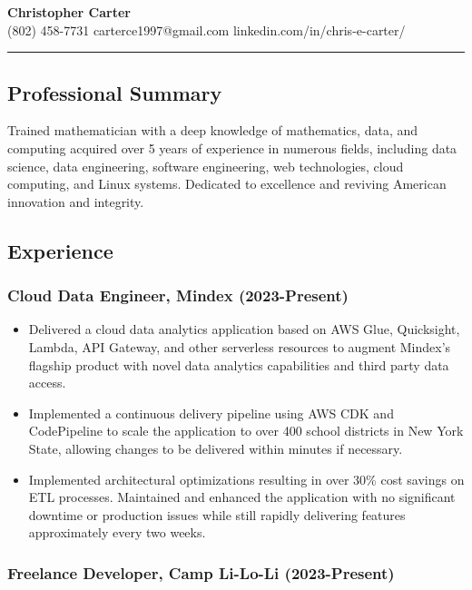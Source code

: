 \documentclass[10pt]{article}
\begin{document}
\begin{center}
	\LARGE{\textbf{Christopher Carter}} \\
	\medskip
	\normalsize{
		(802) 458-7731 \textbar\space carterce1997@gmail.com \textbar\space linkedin.com/in/chris-e-carter/
	}
\end{center}

\hrule

\subsection*{Professional Summary}
Trained mathematician with a deep knowledge of mathematics, data, and computing acquired over 5 years of experience in numerous fields, including data science, data engineering, software engineering, web technologies, cloud computing, and Linux systems. Dedicated to excellence and reviving American innovation and integrity.

\subsection*{Experience}

\subsubsection*{Cloud Data Engineer, Mindex (2023-Present)}
\begin{itemize}
	\setlength{\itemsep}{1pt}
	\setlength{\parskip}{0pt}
	\setlength{\parsep}{0pt}
\item Delivered a cloud data analytics application based on AWS Glue, Quicksight, Lambda, API Gateway, and other serverless resources to augment Mindex’s flagship product with novel data analytics capabilities and third party data access.
\item Implemented a continuous delivery pipeline using AWS CDK and CodePipeline to scale the application to over 400 school districts in New York State, allowing changes to be delivered within minutes if necessary.
\item Implemented architectural optimizations resulting in over 30\% cost savings on ETL processes. Maintained and enhanced the application with no significant downtime or production issues while still rapidly delivering features approximately every two weeks.
\end{itemize}

\subsubsection*{Freelance Developer, Camp Li-Lo-Li (2023-Present)}
\end{document}
